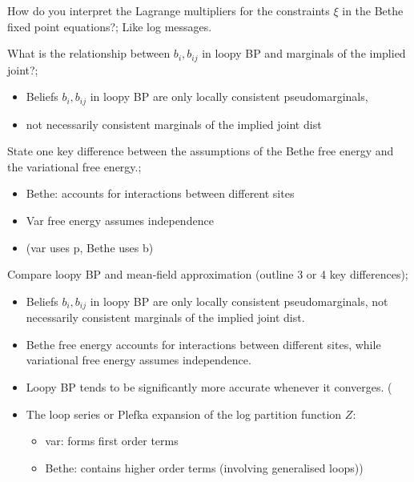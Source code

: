 \documentclass{article}
\begin{document}
How do you interpret the Lagrange multipliers for the constraints $\xi$ in the Bethe fixed point equations?; Like log messages.

What is the relationship between $b_i, b_{ij}$ in loopy BP and marginals of the implied joint?; \begin{itemize} \item Beliefs $b_i, b_{ij}$ in loopy BP are only locally consistent pseudomarginals, \item not necessarily consistent marginals of the implied joint dist \end{itemize}

State one key difference between the assumptions of the Bethe free energy and the variational free energy.; \begin{itemize} \item Bethe: accounts for interactions between different sites \item Var free energy assumes independence \item (var uses p, Bethe uses b) \end{itemize}

Compare loopy BP and mean-field approximation (outline 3 or 4 key differences); \begin{itemize} \item Beliefs $b_i, b_{ij}$ in loopy BP are only locally consistent pseudomarginals, not necessarily consistent marginals of the implied joint dist. \item Bethe free energy accounts for interactions between different sites, while variational free energy assumes independence. \item Loopy BP tends to be significantly more accurate whenever it converges. (\item The loop series or Plefka expansion of the log partition function $Z$: \begin{itemize} \item var: forms first order terms \item Bethe: contains higher order terms (involving generalised loops)) \end{itemize} \end{itemize}
\end{document}
